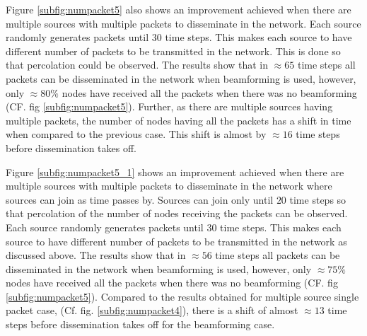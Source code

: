 \documentclass[preprint, twocolumn,5p]{elsarticle}
\begin{document}
    Figure \ref{subfig:numpacket5} also shows an improvement achieved when there are multiple sources with multiple packets to disseminate in the network. Each source randomly generates packets until $30$ time steps. This makes each source to have different number of packets to be transmitted in the network. This is done so that percolation could be observed. The results show that in $\approx65$ time steps all packets can be disseminated in the network when beamforming is used, however, only $\approx80\%$ nodes have received all the packets when there was no beamforming (CF. fig \ref{subfig:numpacket5}). Further, as there are multiple sources having multiple packets, the number of nodes having all the packets has a shift in time when compared to the previous case. This shift is almost by $\approx16$ time steps before dissemination takes off.

    Figure \ref{subfig:numpacket5_1} shows an improvement achieved when there are multiple sources with multiple packets to disseminate in the network where sources can join as time passes by. Sources can join only until $20$ time steps so that percolation of the number of nodes receiving the packets can be observed. Each source randomly generates packets until $30$ time steps. This makes each source to have different number of packets to be transmitted in the network as discussed above. The results show that in $\approx56$ time steps all packets can be disseminated in the network when beamforming is used, however, only $\approx75\%$ nodes have received all the packets when there was no beamforming (CF. fig \ref{subfig:numpacket5}). Compared to the results obtained for multiple source single packet case, (Cf. fig. \ref{subfig:numpacket4}), there is a shift of almost $\approx13$ time steps before dissemination takes off for the beamforming case.
\end{document}

